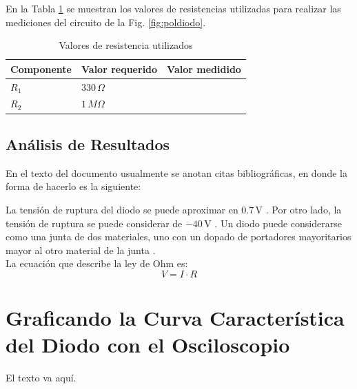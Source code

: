\documentclass[journal]{IEEEtran}
\begin{document}
En la Tabla \ref{tabla1} se muestran los valores de resistencias utilizadas para realizar las mediciones del circuito de la Fig. \ref{fig:poldiodo}.

\begin{table}[!ht]
        \centering
        \caption{Valores de resistencia utilizados}
        \begin{tabular}{|>{\centering\arraybackslash}m{2cm}|>{\centering\arraybackslash}m{2cm}|>{\centering\arraybackslash}m{2cm}|}
             \hline
             Componente & Valor requerido & Valor medidido \\ 
             \hline
             $R_1$ & $330\,\Omega$& \\ 
             \hline
             $R_2$ & $1\,M\Omega$ & \\
             \hline
            \end{tabular}
    	\label{tabla1}   
	\end{table}


\vspace{5mm}

\subsection{Análisis de Resultados}
En el texto del documento usualmente se anotan citas bibliográficas, en donde la forma de hacerlo es la siguiente:


La tensión de ruptura del diodo se puede aproximar en $0.7\,$V \cite{Malik1996,Boylestad,Horowitz1989,Gray1995}. Por otro lado, la tensión de ruptura se puede considerar de $-40\,$V \cite{Floyd2008,Behzad2013,Schilling1994}. Un diodo puede considerarse como una junta de dos materiales, uno con un dopado de portadores mayoritarios mayor al otro material de la junta \cite{Pierret1994}.\\


La ecuación que describe la ley de Ohm es:
\begin{equation}
	V=I\cdot R
\end{equation}

\section{Graficando la Curva Característica del Diodo con el Osciloscopio}
El texto va aquí.
\end{document}
